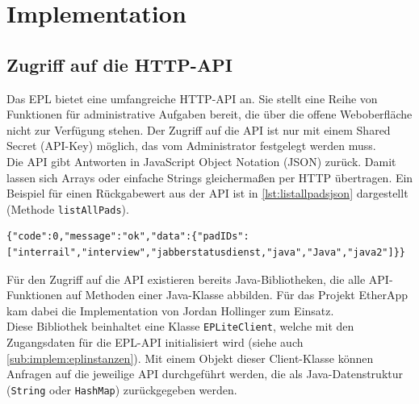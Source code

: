 \section{Implementation}
\label{sec:implem}
\subsection{Zugriff auf die HTTP-API}
Das EPL bietet eine umfangreiche HTTP-API an.
Sie stellt eine Reihe von Funktionen für administrative Aufgaben bereit, die über die offene Weboberfläche nicht zur Verfügung stehen.
Der Zugriff auf die API ist nur mit einem Shared Secret (API-Key) möglich, das vom Administrator festgelegt werden muss.\\
Die API gibt Antworten in JavaScript Object Notation (JSON) zurück.
Damit lassen sich Arrays oder einfache Strings gleichermaßen per HTTP übertragen.
Ein Beispiel für einen Rückgabewert aus der API ist in \autoref{lst:listallpadsjson} dargestellt (Methode \texttt{listAllPads}).
\begin{lstlisting}[caption=Rückgabewert der API zur Methode listAllPads,label=lst:listallpadsjson]
{"code":0,"message":"ok","data":{"padIDs":["interrail","interview","jabberstatusdienst,"java","Java","java2"]}}
\end{lstlisting}

Für den Zugriff auf die API existieren bereits Java-Bibliotheken, die alle API-Funktionen auf Methoden einer Java-Klasse abbilden.
Für das Projekt EtherApp kam dabei die Implementation von Jordan Hollinger zum Einsatz.\\
Diese Bibliothek beinhaltet eine Klasse \texttt{EPLiteClient}, welche mit den Zugangsdaten für die EPL-API initialisiert wird (siehe auch \autoref{sub:implem:eplinstanzen}).
Mit einem Objekt dieser Client-Klasse können Anfragen auf die jeweilige API durchgeführt werden, die als Java-Datenstruktur (\texttt{String} oder \texttt{HashMap}) zurückgegeben werden.



